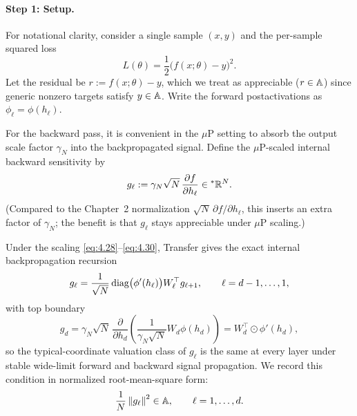 \paragraph{Step 1: Setup.} For notational clarity, consider a single sample $(x, y)$ and the per-sample squared loss
\begin{equation}\label{eq:4.35}
L(\theta) = \frac{1}{2}\bigl(f(x; \theta) - y\bigr)^2.
\end{equation}
Let the residual be $r := f(x; \theta) - y$, which we treat as appreciable ($r \in \mathbb{A}$) since generic nonzero targets satisfy $y \in \mathbb{A}$. Write the forward postactivations as $\phi_\ell = \phi(h_\ell)$.

For the backward pass, it is convenient in the $\mu$P setting to absorb the output scale factor $\gamma_N$ into the backpropagated signal. Define the $\mu$P-scaled internal backward sensitivity by
\begin{equation}\label{eq:4.36}
g_\ell := \gamma_N \sqrt{N}\,\frac{\partial f}{\partial h_\ell} \in {}^*\mathbb{R}^N.
\end{equation}
(Compared to the Chapter~2 normalization $\sqrt{N}\,\partial f / \partial h_\ell$, this inserts an extra factor of $\gamma_N$; the benefit is that $g_\ell$ stays appreciable under $\mu$P scaling.)

Under the scaling \eqref{eq:4.28}--\eqref{eq:4.30}, Transfer gives the exact internal backpropagation recursion
\begin{equation}\label{eq:4.37}
g_\ell = \frac{1}{\sqrt{N}}\operatorname{diag}\bigl(\phi'(h_\ell)\bigr) W_\ell^\top g_{\ell+1}, \qquad \ell = d - 1, \dots, 1,
\end{equation}
with top boundary
\begin{equation}\label{eq:4.38}
g_d = \gamma_N \sqrt{N}\,\frac{\partial}{\partial h_d}\!\left(\frac{1}{\gamma_N\sqrt{N}} W_d \phi(h_d)\right) = W_d^\top \odot \phi'(h_d),
\end{equation}
so the typical-coordinate valuation class of $g_\ell$ is the same at every layer under stable wide-limit forward and backward signal propagation. We record this condition in normalized root-mean-square form:
\begin{equation}\label{eq:4.39}
\frac{1}{N}\left\lVert g_\ell \right\rVert^2 \in \mathbb{A}, \qquad \ell = 1, \dots, d.
\end{equation}

